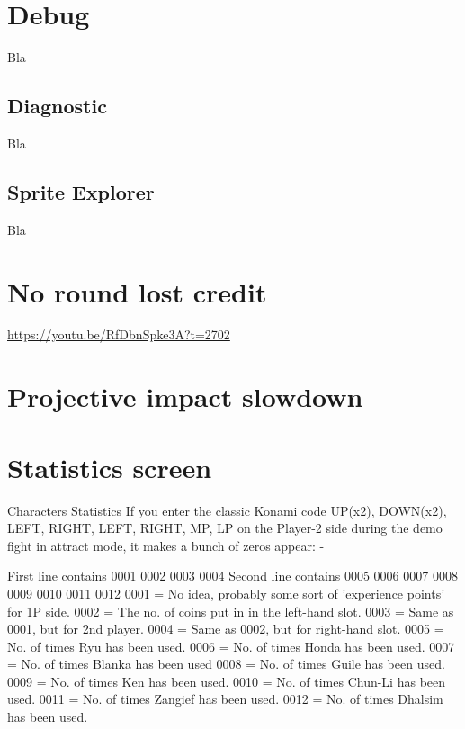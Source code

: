 \section{Debug}
Bla
\subsection{Diagnostic} Bla
\subsection{Sprite Explorer} Bla
\section{No round lost credit}
\url{https://youtu.be/RfDbnSpke3A?t=2702}
\section{Projective impact slowdown}
\section{Statistics screen}
Characters Statistics
If you enter the classic Konami code UP(x2), DOWN(x2), LEFT, RIGHT, LEFT, RIGHT, MP, LP on the Player-2 side during the demo fight in attract mode, it makes a bunch of zeros appear: -

First line contains 0001 0002 0003 0004
Second line contains 0005 0006 0007 0008 0009 0010 0011 0012
0001 = No idea, probably some sort of 'experience points' for 1P side.
0002 = The no. of coins put in in the left-hand slot.
0003 = Same as 0001, but for 2nd player.
0004 = Same as 0002, but for right-hand slot.
0005 = No. of times Ryu has been used.
0006 = No. of times Honda has been used.
0007 = No. of times Blanka has been used
0008 = No. of times Guile has been used.
0009 = No. of times Ken has been used.
0010 = No. of times Chun-Li has been used.
0011 = No. of times Zangief has been used.
0012 = No. of times Dhalsim has been used.